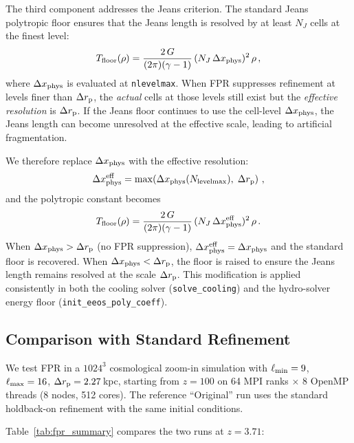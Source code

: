 \documentclass[fleqn,usenatbib]{mnras}
\newcommand{\nlevelmax}{N_{\rm levelmax}}
\newcommand{\code}[1]{\texttt{#1}}
\newcommand{\drp}{\Delta r_{\rm p}}
\newcommand{\dxp}{\Delta x_{\rm phys}}
\begin{document}
The third component addresses the Jeans criterion.  The standard Jeans
polytropic floor ensures that the Jeans length is resolved by at least
$N_J$ cells at the finest level:
\begin{equation}
  T_{\rm floor}(\rho) = \frac{2\,G}{(2\pi)(\gamma-1)}\,
  (N_J\,\dxp)^2\,\rho\,,
  \label{eq:jeans_floor_std}
\end{equation}
where $\dxp$ is evaluated at \code{nlevelmax}.  When FPR suppresses
refinement at levels finer than $\drp$, the \emph{actual} cells at
those levels still exist but the \emph{effective resolution} is
$\drp$.  If the Jeans floor continues to use the cell-level $\dxp$,
the Jeans length can become unresolved at the effective scale, leading
to artificial fragmentation.

We therefore replace $\dxp$ with the effective resolution:
\begin{equation}
  \dxp^{\rm eff} = \max\!\left(\dxp(\nlevelmax),\;\drp\right)\,,
  \label{eq:dx_eff}
\end{equation}
and the polytropic constant becomes
\begin{equation}
  T_{\rm floor}(\rho) = \frac{2\,G}{(2\pi)(\gamma-1)}\,
  (N_J\,\dxp^{\rm eff})^2\,\rho\,.
  \label{eq:jeans_floor_fpr}
\end{equation}
When $\dxp > \drp$ (no FPR suppression), $\dxp^{\rm eff} = \dxp$ and
the standard floor is recovered.  When $\dxp < \drp$, the floor is
raised to ensure the Jeans length remains resolved at the scale
$\drp$.  This modification is applied consistently in both the cooling
solver (\code{solve\_cooling}) and the hydro-solver energy floor
(\code{init\_eeos\_poly\_coeff}).

\subsection{Comparison with Standard Refinement}
\label{sec:fpr_results}

We test FPR in a $1024^3$ cosmological zoom-in simulation with
$\ell_{\rm min} = 9$, $\ell_{\rm max} = 16$, $\drp = 2.27\,$kpc,
starting from $z=100$ on 64 MPI ranks $\times$ 8 OpenMP threads (8
nodes, 512 cores).  The reference ``Original'' run uses the standard
holdback-on refinement with the same initial conditions.

Table~\ref{tab:fpr_summary} compares the two runs at $z = 3.71$:
\end{document}
